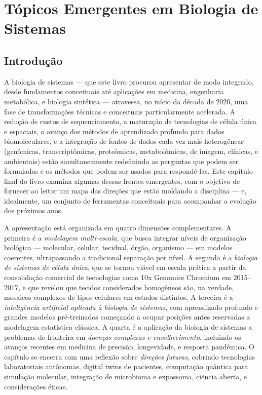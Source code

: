 \chapter{Tópicos Emergentes em Biologia de Sistemas}
\label{cap:15}

\normalfont\rmfamily\upshape
\section{Introdução}
\label{sec:15-introducao}

A biologia de sistemas --- que este livro procurou apresentar de modo integrado, desde fundamentos conceituais até aplicações em medicina, engenharia metabólica, e biologia sintética --- atravessa, no início da década de 2020, uma fase de transformações técnicas e conceituais particularmente acelerada. A redução de custos de sequenciamento, a maturação de tecnologias de célula única e espaciais, o avanço dos métodos de aprendizado profundo para dados biomoleculares, e a integração de fontes de dados cada vez mais heterogêneas (genômicas, transcriptômicas, proteômicas, metabolômicas, de imagem, clínicas, e ambientais) estão simultaneamente redefinindo as perguntas que podem ser formuladas e os métodos que podem ser usados para respondê-las. Este capítulo final do livro examina algumas dessas frentes emergentes, com o objetivo de fornecer ao leitor um mapa das direções que estão moldando a disciplina --- e, idealmente, um conjunto de ferramentas conceituais para acompanhar a evolução dos próximos anos.

A apresentação está organizada em quatro dimensões complementares. A primeira é a \emph{modelagem multi-escala}, que busca integrar níveis de organização biológica --- molecular, celular, tecidual, órgão, organismo --- em modelos coerentes, ultrapassando a tradicional separação por nível. A segunda é a \emph{biologia de sistemas de célula única}, que se tornou viável em escala prática a partir da consolidação comercial de tecnologias como 10x Genomics Chromium em 2015--2017, e que revelou que tecidos considerados homogêneos são, na verdade, mosaicos complexos de tipos celulares em estados distintos. A terceira é a \emph{inteligência artificial aplicada à biologia de sistemas}, com aprendizado profundo e grandes modelos pré-treinados começando a ocupar posições antes reservadas a modelagem estatística clássica. A quarta é a aplicação da biologia de sistemas a problemas de fronteira em \emph{doenças complexas e envelhecimento}, incluindo os avanços recentes em medicina de precisão, longevidade, e resposta pandêmica. O capítulo se encerra com uma reflexão sobre \emph{direções futuras}, cobrindo tecnologias laboratoriais autônomas, digital twins de pacientes, computação quântica para simulação molecular, integração de microbioma e expossoma, ciência aberta, e considerações éticas.

